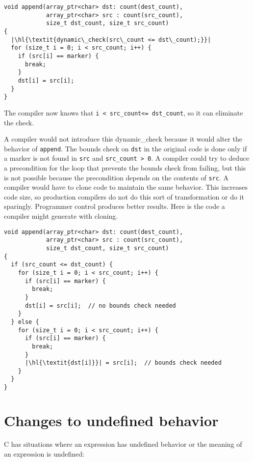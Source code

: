 \begin{lstlisting}[escapechar=\|]
void append(array_ptr<char> dst: count(dest_count),
            array_ptr<char> src : count(src_count),
            size_t dst_count, size_t src_count)
{
  |\hl{\textit{dynamic\_check(src\_count <= dst\_count);}}|
  for (size_t i = 0; i < src_count; i++) {
    if (src[i] == marker) {
      break;
    }
    dst[i] = src[i];
  }
}
\end{lstlisting}

The compiler now knows that \lstinline+i < src_count<= dst_count+,
so it can eliminate the check.

A compiler would not introduce this dynamic\_check because it would
alter the behavior of \lstinline+append+. The bounds check on \lstinline+dst+
in the original code is done only if a marker is not found in
\lstinline+src+ and \lstinline+src_count > 0+. A compiler could
try to deduce a precondition for the loop 
that prevents the bounds check from failing, but this is
not possible because the precondition depends on the contents of
\lstinline+src+. A compiler would have to clone code to maintain the same
behavior. This increases code size, so production compilers do not do this
sort of transformation or do it sparingly. Programmer control produces
better results.   Here is the code a compiler might generate with cloning.

\begin{lstlisting}[escapechar=\|]
void append(array_ptr<char> dst: count(dest_count), 
            array_ptr<char> src : count(src_count),
            size_t dst_count, size_t src_count)
{
  if (src_count <= dst_count) {
    for (size_t i = 0; i < src_count; i++) {
      if (src[i] == marker) {
        break;
      }
      dst[i] = src[i];  // no bounds check needed
    }
  } else {
    for (size_t i = 0; i < src_count; i++) {
      if (src[i] == marker) {
        break;
      }
      |\hl{\textit{dst[i]}}| = src[i];  // bounds check needed
    }
  }
}
\end{lstlisting}

\section{Changes to undefined behavior}
\label{section:changes-to-undefined-behavior}

C has situations where an expression has undefined behavior or the
meaning of an expression is undefined:

